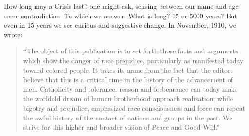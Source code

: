 \documentclass[letterpaper,10pt,english]{jupyterBook}
\begin{document}
\sphinxAtStartPar
How long may a Crisis last? one might ask, sensing between our name and age some contradiction. To which we answer: What is long? 15 or 5000 years? But even in 15 years we see curious and suggestive change. In November, 1910, we wrote:
\begin{quote}

\sphinxAtStartPar
“The object of this publication is to set forth those facts and arguments which show the danger of race prejudice, particularly as manifested today toward colored people. It takes its name from the fact that the editors believe that this is a critical time in the history of the advancement of men. Catholicity and tolerance. reason and forbearance can today make the world\sphinxhyphen{}old dream of human brotherhood approach realization; while bigotry and prejudice, emphasized race consciousness and force can repeat the awful history of the contact of nations and groups in the past. We strive for this higher and broader vision of Peace and Good Will.”
\end{quote}
\end{document}
